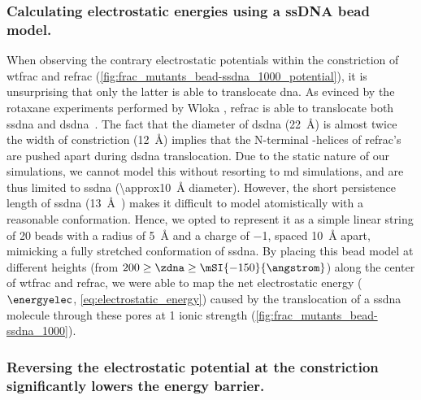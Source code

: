 \subsubsection{Calculating electrostatic energies using a {ssDNA} bead model.}
%

When observing the contrary electrostatic potentials within the constriction of \gls{wtfrac} and \gls{refrac}
(\cref{fig:frac_mutants_bead-ssdna_1000_potential}), it is unsurprising that only the latter is able to
translocate \gls{dna}. As evinced by the rotaxane experiments performed by Wloka \etal{}, \gls{refrac} is able
to translocate both \gls{ssdna} and \gls{dsdna}~\cite{Wloka-2016}. The fact that the diameter of \gls{dsdna}
(\SI{22}{\angstrom}) is almost twice the width of constriction (\SI{12}{\angstrom}) implies that the
N-terminal \ta-helices of \gls{refrac}'s are pushed apart during \gls{dsdna} translocation. Due to the static
nature of our simulations, we cannot model this without resorting to \gls{md} simulations, and are thus
limited to \gls{ssdna} (\SI{\approx10}{\angstrom} diameter). However, the short persistence length of
\gls{ssdna} (\SI{13}{\angstrom}~\cite{Tinland-1997}) makes it difficult to model atomistically with a
reasonable conformation. Hence, we opted to represent it as a simple linear string of 20 beads with a radius
of \SI{5}{\angstrom} and a charge of \SI{-1}{\ec}, spaced \SI{10}{\angstrom} apart, mimicking a fully
stretched conformation of \gls{ssdna}. By placing this bead model at different heights (from $200 \ge \zdna
\ge \mSI{-150}{\angstrom}$) along the center of \gls{wtfrac} and \gls{refrac}, we were able to map the net
electrostatic energy ($\energyelec$, \cref{eq:electrostatic_energy}) caused by the translocation of a
\gls{ssdna} molecule through these pores at \SI{1}{\Molar} ionic strength
(\cref{fig:frac_mutants_bead-ssdna_1000}). 

\subsubsection{Reversing the electrostatic potential at the constriction significantly lowers the energy barrier.}
%

